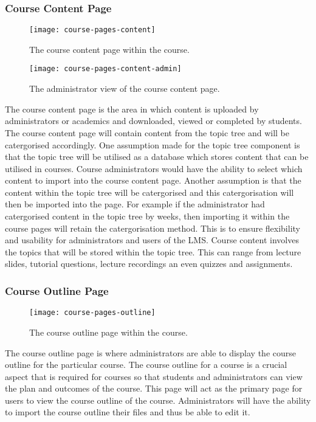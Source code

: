 \subsubsection{Course Content Page}
\begin{figure}[h]
    \centering
    \texttt{[image: course-pages-content]}
    \caption{The course content page within the course.}
\end{figure}
\begin{figure}[h]
    \centering
    \texttt{[image: course-pages-content-admin]}
    \caption{The administrator view of the course content page.}
\end{figure}
The course content page is the area in which content is uploaded by administrators or academics and downloaded, viewed or completed by students.
The course content page will contain content from the topic tree and will be catergorised accordingly. 
One assumption made for the topic tree component is that the topic tree will be utilised as a database which stores content that can be utilised in courses.
Course administrators would have the ability to select which content to import into the course content page. 
Another assumption is that the content within the topic tree will be catergorised and this catergorisation will then be imported into the page.
For example if the administrator had catergorised content in the topic tree by weeks, then importing it within the course pages will retain the catergorisation method.
This is to ensure flexibility and usability for administrators and users of the LMS.
Course content involves the topics that will be stored within the topic tree. This can range from lecture slides, tutorial questions, lecture recordings an even quizzes and assignments. 


\subsubsection{Course Outline Page}
\begin{figure}[h]
    \centering
    \texttt{[image: course-pages-outline]}
    \caption{The course outline page within the course.}
\end{figure}
The course outline page is where administrators are able to display the course outline for the particular course. 
The course outline for a course is a crucial aspect that is required for courses so that students and administrators can view the plan and outcomes of the course.
This page will act as the primary page for users to view the course outline of the course. 
Administrators will have the ability to import the course outline their files and thus be able to edit it.

